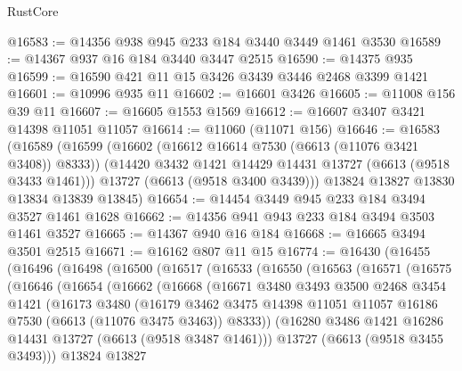 \begin{lexlean}{RustCore}
\begin{coremodule}
@16583 := @14356 @938 @945 @233 @184 @3440 @3449 @1461 @3530
@16589 := @14367 @937 @16 @184 @3440 @3447 @2515
@16590 := @14375 @935
@16599 := @16590 @421 @11 @15 @3426 @3439 @3446 @2468 @3399 @1421
@16601 := @10996 @935 @11
@16602 := @16601 @3426
@16605 := @11008 @156 @39 @11
@16607 := @16605 @1553 @1569
@16612 := @16607 @3407 @3421 @14398 @11051 @11057
@16614 := @11060 (@11071 @156)
@16646 := @16583
    (@16589
      (@16599
        (@16602 (@16612 @16614 @7530 (@6613 (@11076 @3421 @3408)) @8333))
        (@14420 @3432 @1421 @14429 @14431 @13727 (@6613 (@9518 @3433 @1461)))
        @13727
        (@6613 (@9518 @3400 @3439)))
      @13824
      @13827
      @13830
      @13834
      @13839
      @13845)
@16654 := @14454 @3449 @945 @233 @184 @3494 @3527 @1461 @1628
@16662 := @14356 @941 @943 @233 @184 @3494 @3503 @1461 @3527
@16665 := @14367 @940 @16 @184
@16668 := @16665 @3494 @3501 @2515
@16671 := @16162 @807 @11 @15
@16774 := @16430
    (@16455
      (@16496
        (@16498
          (@16500
            (@16517
              (@16533
                (@16550
                  (@16563
                    (@16571
                      (@16575
                        (@16646
                          (@16654
                            (@16662
                              (@16668
                                (@16671
                                  @3480
                                  @3493
                                  @3500
                                  @2468
                                  @3454
                                  @1421
                                  (@16173
                                    @3480
                                    (@16179
                                      @3462
                                      @3475
                                      @14398
                                      @11051
                                      @11057
                                      @16186
                                      @7530
                                      (@6613 (@11076 @3475 @3463))
                                      @8333))
                                  (@16280
                                    @3486
                                    @1421
                                    @16286
                                    @14431
                                    @13727
                                    (@6613 (@9518 @3487 @1461)))
                                  @13727
                                  (@6613 (@9518 @3455 @3493)))
                                @13824
                                @13827

\end{coremodule}
\end{lexlean}

